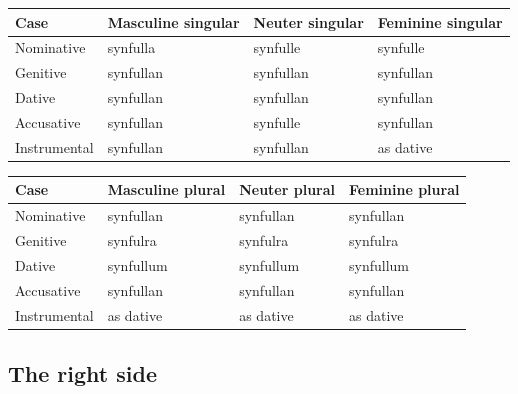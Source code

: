\par\begingroup
\fontsize{10.5}{13.2}\selectfont
\setlength{\LTleft}{0pt}\setlength{\LTright}{\fill}
\noindent
\begin{tabular}{@{}>{\raggedright\arraybackslash}p{22.0mm}>{\raggedright\arraybackslash}p{31.188mm}>{\raggedright\arraybackslash}p{31.188mm}>{\raggedright\arraybackslash}p{31.188mm}@{}}
\toprule
\textbf{Case} & \textbf{Masculine singular} & \textbf{Neuter singular} & \textbf{Feminine singular} \\
\midrule
Nominative & synfulla & synfulle & synfulle \\
Genitive & synfullan & synfullan & synfullan \\
Dative & synfullan & synfullan & synfullan \\
Accusative & synfullan & synfulle & synfullan \\
Instrumental & synfullan & synfullan & as dative \\
\bottomrule
\end{tabular}
\par\endgroup
\par\addvspace{5pt}
\par\begingroup
\fontsize{10.5}{13.2}\selectfont
\setlength{\LTleft}{0pt}\setlength{\LTright}{\fill}
\noindent
\begin{tabular}{@{}>{\raggedright\arraybackslash}p{22.0mm}>{\raggedright\arraybackslash}p{31.188mm}>{\raggedright\arraybackslash}p{31.188mm}>{\raggedright\arraybackslash}p{31.188mm}@{}}
\toprule
\textbf{Case} & \textbf{Masculine plural} & \textbf{Neuter plural} & \textbf{Feminine plural} \\
\midrule
Nominative & synfullan & synfullan & synfullan \\
Genitive & synfulra & synfulra & synfulra \\
Dative & synfullum & synfullum & synfullum \\
Accusative & synfullan & synfullan & synfullan \\
Instrumental & as dative & as dative & as dative \\
\bottomrule
\end{tabular}
\par\endgroup

\subsection*{The right side}


